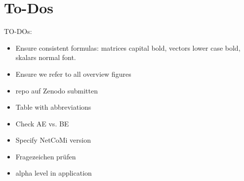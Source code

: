 \chapter*{To-Dos}

TO-DOs:
\begin{itemize}
    \item Ensure consistent formulas: matrices capital bold, vectors lower case bold, skalars normal font.
    \item Ensure we refer to all overview figures
    \item repo auf Zenodo submitten
    \item Table with abbreviations
    \item Check AE vs. BE
    \item Specify NetCoMi version
    \item Fragezeichen prüfen
	\item alpha level in application
\end{itemize}
